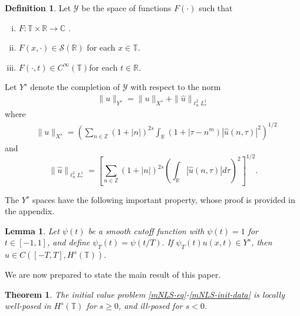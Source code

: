 \documentclass[12pt,reqno]{amsart}
\numberwithin{equation}{section}  %
\numberwithin{figure}{section}
\newcommand{\rr}{\mathbb{R}}
\newcommand{\zz}{\mathbb{Z}}
\newcommand{\cc}{\mathbb{C}}
\newcommand{\ci}{\mathbb{T}}
\newcommand{\wh}{\widehat}
\theoremstyle{plain}
\newtheorem{theorem}{Theorem}
\newtheorem{lemma}{Lemma}
\theoremstyle{definition}
\newtheorem{definition}{Definition}
\theoremstyle{remark}
\begin{document}
\begin{definition}
  Let $\mathcal{Y}$ be the space of functions $F(\cdot)$ such that
  \begin{enumerate}[(i)]
   \item{$F: \ci \times \rr \to \cc$ }.
   \item{ $F(x, \cdot) \in \mathcal{S}(\rr)$ for each $x \in \ci$}.
   \item{ $F(\cdot, t) \in C^{\infty}(\ci)$for each $t \in \rr$}.
  \end{enumerate}
  Let $Y^{s}$ denote the completion of $\mathcal{Y}$ with
  respect to the norm
  \begin{equation}
	\label{Y-s-norm}
	\begin{split}
		\|u\|_{Y^s} = \|u\|_{X^s} + \|\wh{u}\|_{ \ell^2_n L^1_\tau }
	\end{split}
\end{equation}
    where
\begin{equation}
	\label{X^s-norm}
	\begin{split}
		& \|u\|_{X^s}
		= \left ( \sum_{n\in \zz} \left (1 + |n| \right )^{2s} \int_\rr \left ( 1 + | 
		\tau - n^{m } \right ) | \wh{u} ( n, \tau ) |^2
		\right )^{1/2}
	\end{split}
\end{equation}
and
%
%
\begin{equation}
	\label{E-norm}
	\|\wh{u}\|_{ \ell^2_n L^1_\tau } = \left[ \sum_{n \in \zz}(1 + | n |)^{2s} \left(
	\int_{\rr}| \wh{u}(n, \tau) |d \tau \right)^{2} \right]^{1/2}.
\end{equation}
  \end{definition}

%
The $Y^s$ spaces have the following important property, whose proof
is provided in the appendix.
\begin{lemma}
	\label{lem:cutoff-loc-soln}
	Let $\psi(t)$ be a smooth cutoff function with $\psi(t) =1$ for $t \in [-1,
  1]$, and define $\psi_{T}(t) = \psi(t/T).$ If
  $\psi_{T}(t)u(x,t) \in Y^s$, then $u \in C([-T, T], H^s(\ci))$.
\end{lemma}
We are now prepared to state the main result of this paper.
%
%
%
%
%
%
%
%
%
%
\begin{theorem}
\label{thm:main}
The initial value problem 
\eqref{mNLS-eq}-\eqref{mNLS-init-data} is locally well-posed in $H^s(\ci)$ for $s \ge
0$, and ill-posed for $s <0$. %
%
\end{theorem} 
%
%
%
%
%
%
%
%
%
%
\end{document}
